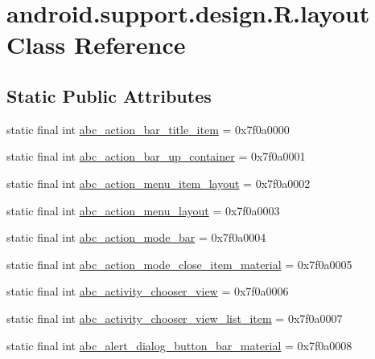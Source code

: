\hypertarget{classandroid_1_1support_1_1design_1_1_r_1_1layout}{}\section{android.\+support.\+design.\+R.\+layout Class Reference}
\label{classandroid_1_1support_1_1design_1_1_r_1_1layout}
\subsection*{Static Public Attributes}
\begin{DoxyCompactItemize}
\item 
static final int \mbox{\hyperlink{classandroid_1_1support_1_1design_1_1_r_1_1layout_a531b33a0bb0538dd1d077ef414f13912}{abc\+\_\+action\+\_\+bar\+\_\+title\+\_\+item}} = 0x7f0a0000
\item 
static final int \mbox{\hyperlink{classandroid_1_1support_1_1design_1_1_r_1_1layout_a65ed125f76e124be64ba517ed6388a2f}{abc\+\_\+action\+\_\+bar\+\_\+up\+\_\+container}} = 0x7f0a0001
\item 
static final int \mbox{\hyperlink{classandroid_1_1support_1_1design_1_1_r_1_1layout_aa31161c408085d6a0ce8b75edb2821bf}{abc\+\_\+action\+\_\+menu\+\_\+item\+\_\+layout}} = 0x7f0a0002
\item 
static final int \mbox{\hyperlink{classandroid_1_1support_1_1design_1_1_r_1_1layout_a950d7d0ec60597ed0fceff4da4d8a6ee}{abc\+\_\+action\+\_\+menu\+\_\+layout}} = 0x7f0a0003
\item 
static final int \mbox{\hyperlink{classandroid_1_1support_1_1design_1_1_r_1_1layout_a4ed2ccdae8bbfabdb968a36d217cfb5e}{abc\+\_\+action\+\_\+mode\+\_\+bar}} = 0x7f0a0004
\item 
static final int \mbox{\hyperlink{classandroid_1_1support_1_1design_1_1_r_1_1layout_acf611bbfd39d0104f58774f7799a59c0}{abc\+\_\+action\+\_\+mode\+\_\+close\+\_\+item\+\_\+material}} = 0x7f0a0005
\item 
static final int \mbox{\hyperlink{classandroid_1_1support_1_1design_1_1_r_1_1layout_a43a54b73c3cfb776e7a50094cc91b8c1}{abc\+\_\+activity\+\_\+chooser\+\_\+view}} = 0x7f0a0006
\item 
static final int \mbox{\hyperlink{classandroid_1_1support_1_1design_1_1_r_1_1layout_aadf7a74bdcfcc0214b577ca8912b47d1}{abc\+\_\+activity\+\_\+chooser\+\_\+view\+\_\+list\+\_\+item}} = 0x7f0a0007
\item 
static final int \mbox{\hyperlink{classandroid_1_1support_1_1design_1_1_r_1_1layout_a236c5dbe0e7c111d43f617e27569965d}{abc\+\_\+alert\+\_\+dialog\+\_\+button\+\_\+bar\+\_\+material}} = 0x7f0a0008

\end{DoxyCompactItemize}
